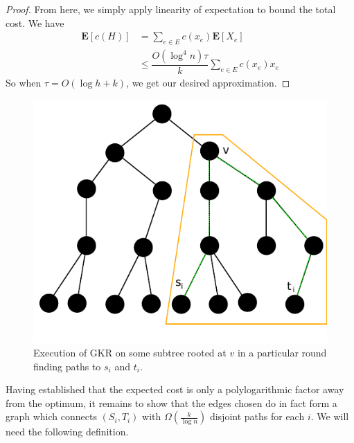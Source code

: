 \documentclass[12pt]{article}
\begin{document}
\begin{proof}
From here, we simply apply linearity of expectation to bound the total cost. We have 
%
%
\begin{align}
\textbf{E}[c(H)] &= \sum_{e \in E} c(x_e)\textbf{E}[X_e] \\
                 &\leq \dfrac{O(\log^4 n)\tau}{k} \sum_{e \in E} c(x_e) x_e
\end{align}
So when $\tau = O(\log h + k)$, we get our desired approximation.
\end{proof}

\begin{figure}
\label{fig:roundgkronnode}
\centering
\includegraphics[width=0.6\linewidth]{RoundGKRonNode.pdf}
\caption{Execution of GKR on some subtree rooted at $v$ in a particular round finding paths to $s_i$ and $t_i$.}
\end{figure}

Having established that the expected cost is only a polylogarithmic factor away from the optimum, it remains to show that the edges chosen do in fact form a graph which connects $(S_i, T_i)$ with $\Omega(\frac{k}{\log n})$ disjoint paths for each $i$. We will need the following definition.
\end{document}
